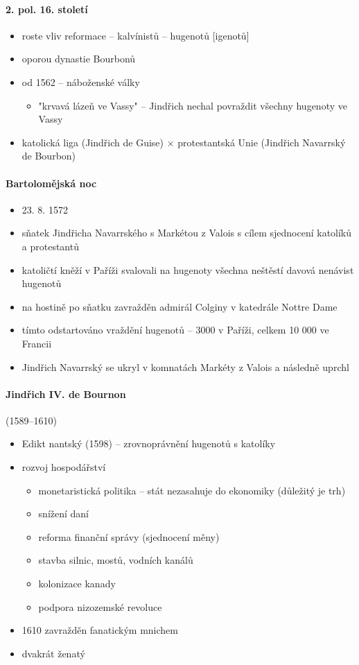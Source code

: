 \paragraph{2. pol. 16. století}
\begin{itemize}
\item roste vliv reformace -- kalvínistů -- hugenotů [igenotů]
\item oporou dynastie Bourbonů
\item od 1562 -- náboženské války 
	\begin{itemize}
	\item "krvavá lázeň ve Vassy" -- Jindřich nechal povraždit všechny hugenoty ve Vassy
	\end{itemize}
\item katolická liga (Jindřich de Guise) $\times$ protestantská Unie (Jindřich Navarrský de Bourbon)
\end{itemize}

\paragraph{Bartolomějská noc}
\begin{itemize}
\item 23. 8. 1572
\item sňatek Jindřicha Navarrského s Markétou z Valois s cílem sjednocení katolíků a protestantů
\item katoličtí kněží v Paříži svalovali na hugenoty všechna neštěstí \ra davová nenávist hugenotů
\item na hostině po sňatku zavražděn admirál Colginy v katedrále Nottre Dame
\item tímto odstartováno vraždění hugenotů -- 3000 v Paříži, celkem 10 000 ve Francii
\item Jindřich Navarrský se ukryl v komnatách Markéty z Valois a následně uprchl

\end{itemize}

\paragraph{Jindřich IV. de Bournon} (1589--1610)
\begin{itemize}
\item Edikt nantský (1598) -- zrovnoprávnění hugenotů s katolíky
\item rozvoj hospodářství
	\begin{itemize}
	\item monetaristická politika -- stát nezasahuje do ekonomiky (důležitý je trh)
	\item snížení daní
	\item reforma finanční správy (sjednocení měny)
	\item stavba silnic, mostů, vodních kanálů 
	\item kolonizace kanady
	\item podpora nizozemské revoluce
	\end{itemize}
\item 1610 zavražděn fanatickým mnichem
\item dvakrát ženatý
\end{itemize}

